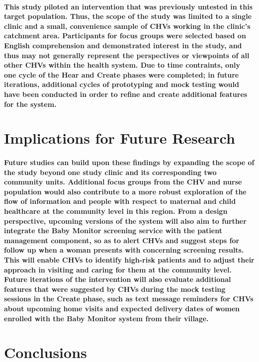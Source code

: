 \paragraph{This study piloted an intervention that was previously untested in this target population. Thus, the scope of the study was limited to a single clinic and a small, convenience sample of CHVs working in the clinic's catchment area. Participants for focus groups were selected based on English comprehension and demonstrated interest in the study, and thus may not generally represent the perspectives or viewpoints of all other CHVs within the health system. Due to time contraints, only one cycle of the Hear and Create phases were completed; in future iterations, additional cycles of prototyping and mock testing would have been conducted in order to refine and create additional features for the system.  }

\section{Implications for Future Research}
\paragraph{Future studies can build upon these findings by expanding the scope of the study beyond one study clinic and its corresponding two community units. Additional focus groups from the CHV and nurse population would also contribute to a more robust exploration of the flow of information and people with respect to maternal and child healthcare at the community level in this region. From a design perspective, upcoming versions of the system will also aim to further integrate the Baby Monitor screening service with the patient management component, so as to alert CHVs and suggest steps for follow up when a woman presents with concerning screening results. This will enable CHVs to identify high-risk patients and to adjust their approach in visiting and caring for them at the community level. Future iterations of the intervention will also evaluate additional features that were suggested by CHVs during the mock testing sessions in the Create phase, such as text message reminders for CHVs about upcoming home visits and expected delivery dates of women enrolled with the Baby Monitor system from their village. }


\section{Conclusions}
